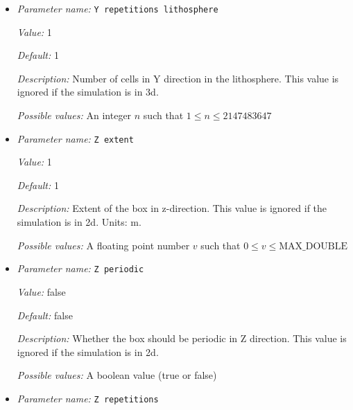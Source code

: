 \begin{itemize}
{\it Default:} 1


{\it Description:} Number of cells in Y direction of the lower box. If the simulation is in 3d, the same number of repetitions will be used in the upper box.


{\it Possible values:} An integer $n$ such that $1\leq n \leq 2147483647$
\item {\it Parameter name:} {\tt Y repetitions lithosphere}
\label{parameters:Geometry model/Box with lithosphere boundary indicators/Y repetitions lithosphere}


{\it Value:} 1


{\it Default:} 1


{\it Description:} Number of cells in Y direction in the lithosphere. This value is ignored if the simulation is in 3d.


{\it Possible values:} An integer $n$ such that $1\leq n \leq 2147483647$
\item {\it Parameter name:} {\tt Z extent}
\label{parameters:Geometry model/Box with lithosphere boundary indicators/Z extent}


{\it Value:} 1


{\it Default:} 1


{\it Description:} Extent of the box in z-direction. This value is ignored if the simulation is in 2d. Units: m.


{\it Possible values:} A floating point number $v$ such that $0 \leq v \leq \text{MAX\_DOUBLE}$
\item {\it Parameter name:} {\tt Z periodic}
\label{parameters:Geometry model/Box with lithosphere boundary indicators/Z periodic}


{\it Value:} false


{\it Default:} false


{\it Description:} Whether the box should be periodic in Z direction. This value is ignored if the simulation is in 2d.


{\it Possible values:} A boolean value (true or false)
\item {\it Parameter name:} {\tt Z repetitions}
\label{parameters:Geometry model/Box with lithosphere boundary indicators/Z repetitions}



\end{itemize}
